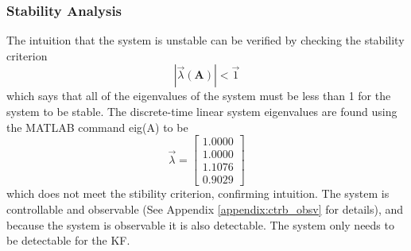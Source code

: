 \documentclass{article}
\newcommand{\matr}[1]{\bm{#1}}     %
\begin{document}
\subsubsection{Stability Analysis}
The intuition that the system is unstable can be verified by checking the stability criterion
\begin{equation}
|\vec{\lambda}(\matr{A})| < \vec{1}
\end{equation}
which says that all of the eigenvalues of the system must be less than 1 for the system to be stable. The discrete-time linear system eigenvalues are found using the MATLAB command eig(A) to be
\begin{equation}
\vec{\lambda} = \begin{bmatrix}
    1.0000 \\
    1.0000 \\
    1.1076 \\
    0.9029
\end{bmatrix}
\end{equation}
which does not meet the stibility criterion, confirming intuition.  The system is controllable and observable (See Appendix \ref{appendix:ctrb_obsv} for details), and because the system is observable it is also detectable.  The system only needs to be detectable for the KF.
\end{document}
